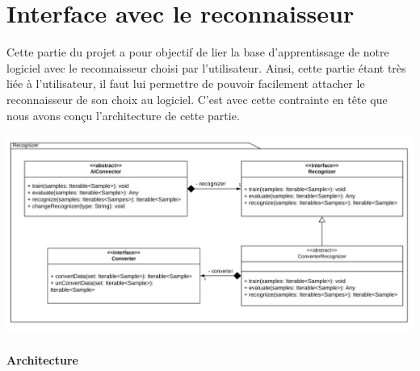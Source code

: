 \section{Interface avec le reconnaisseur}

Cette partie du projet a pour objectif de lier la base d'apprentissage de notre logiciel avec le reconnaisseur choisi par l'utilisateur. Ainsi, cette partie étant très liée à l'utilisateur, il faut lui permettre de pouvoir facilement attacher le reconnaisseur de son choix au logiciel. C'est avec cette contrainte en tête que nous avons conçu l'architecture de cette partie.

\newpage{}
\begin{mdframed}[frametitle={Figure 10 : Architecture de l'interface avec le reconnaisseur}, innerbottommargin=10]
\begin{center}
\includegraphics[trim={0, 0, 0, 0}, scale=0.55]{assets/UML_Recognizer.pdf}
\end{center}
\end{mdframed}

\paragraph{Architecture}

